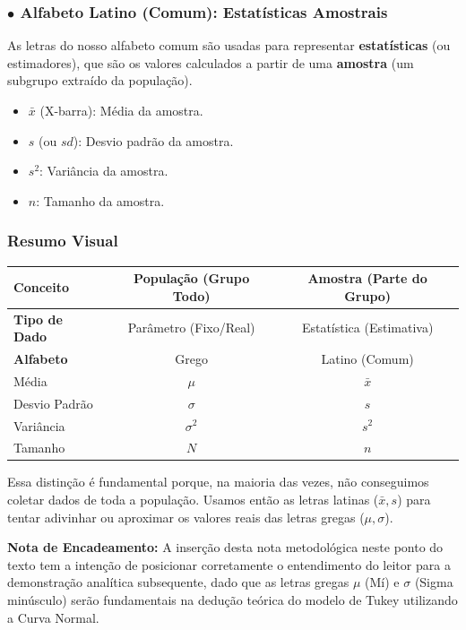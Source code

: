 \documentclass[12pt,a4paper]{article}
\begin{document}
\subsubsection*{$\bullet$ Alfabeto Latino (Comum): Estatísticas Amostrais}
As letras do nosso alfabeto comum são usadas para representar \textbf{estatísticas} (ou estimadores), que são os valores calculados a partir de uma \textbf{amostra} (um subgrupo extraído da população).
\begin{itemize}
    \item $\bar{x}$ (X-barra): Média da amostra.
    \item $s$ (ou $sd$): Desvio padrão da amostra.
    \item $s^2$: Variância da amostra.
    \item $n$: Tamanho da amostra.
\end{itemize}

\subsubsection*{Resumo Visual}
\begin{table}[H]
\centering
\begin{tabular}{@{}lcc@{}}
\toprule
\textbf{Conceito} & \textbf{População (Grupo Todo)} & \textbf{Amostra (Parte do Grupo)} \\ \midrule
\textbf{Tipo de Dado} & Parâmetro (Fixo/Real) & Estatística (Estimativa) \\
\textbf{Alfabeto} & Grego & Latino (Comum) \\ \addlinespace
Média & $\mu$ & $\bar{x}$ \\
Desvio Padrão & $\sigma$ & $s$ \\
Variância & $\sigma^2$ & $s^2$ \\
Tamanho & $N$ & $n$ \\ \bottomrule
\end{tabular}
\end{table}

\noindent Essa distinção é fundamental porque, na maioria das vezes, não conseguimos coletar dados de toda a população. Usamos então as letras latinas ($\bar{x}, s$) para tentar adivinhar ou aproximar os valores reais das letras gregas ($\mu, \sigma$).

\vspace{0.3cm}
\noindent \textbf{Nota de Encadeamento:} A inserção desta nota metodológica neste ponto do texto tem a intenção de posicionar corretamente o entendimento do leitor para a demonstração analítica subsequente, dado que as letras gregas $\mu$ (Mí) e $\sigma$ (Sigma minúsculo) serão fundamentais na dedução teórica do modelo de Tukey utilizando a Curva Normal.
\end{document}
